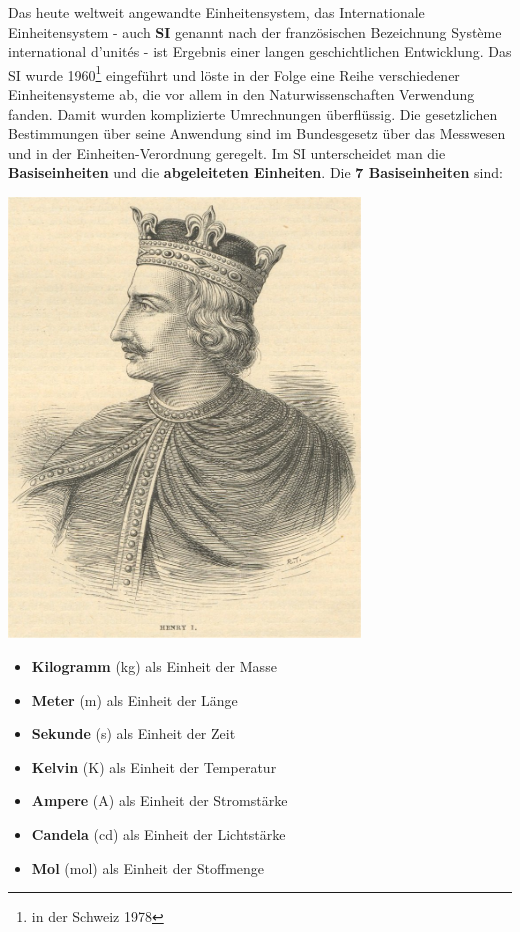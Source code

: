 Das heute weltweit angewandte Einheitensystem, das Internationale Einheitensystem - auch \textbf{SI} genannt nach der französischen Bezeichnung Système international d'unités - ist Ergebnis einer langen geschichtlichen Entwicklung. Das SI wurde 1960\footnote{in der Schweiz 1978} eingeführt und löste in der Folge eine Reihe verschiedener Einheitensysteme ab, die vor allem in den Naturwissenschaften Verwendung 
fanden. Damit wurden komplizierte Umrechnungen überflüssig. Die gesetzlichen Bestimmungen über seine Anwendung sind im Bundesgesetz über das Messwesen und in der Einheiten-Verordnung geregelt. Im SI unterscheidet man die \textbf{Basiseinheiten} und die 
\textbf{abgeleiteten Einheiten}. Die \textbf{7 Basiseinheiten} sind:
\begin{marginfigure}
	\includegraphics[width=0.7\textwidth]{Bilder/Henry.jpg}
	\caption{König Henry I. von England führte 1011 die Längeneinheit Yard als die Distanz zwischen seiner Nasenspitze und der Daumenspitze seines ausgestreckten Arms ein. Ein Yard entspricht \SI{0.9144}{\metre}}
\end{marginfigure}
\begin{multicols}{2}
\begin{itemize}
	\item \textbf{Kilogramm} (\si{\kilogram}) als Einheit der Masse 
	\item \textbf{Meter} (\si{\metre}) als Einheit der Länge
	\item \textbf{Sekunde} (\si{\second}) als Einheit der Zeit
	\item \textbf{Kelvin} (\si{\kelvin}) als Einheit der Temperatur
	\item \textbf{Ampere} (\si{\ampere}) als Einheit der Stromstärke
	\item \textbf{Candela} (\si{\candela}) als Einheit der Lichtstärke
	\item \textbf{Mol} (\si{mol}) als Einheit der Stoffmenge
\end{itemize} 
\end{multicols}
